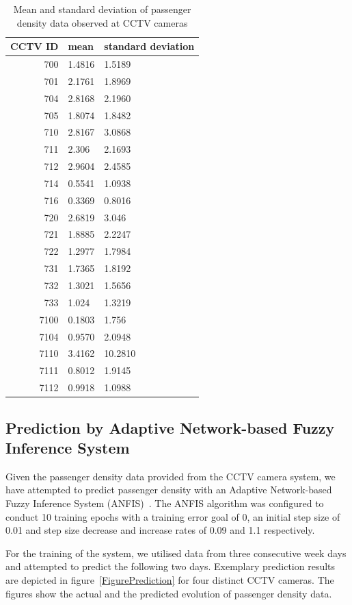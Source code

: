 \begin{table}
\begin{center}
\caption{Mean and standard deviation of passenger density data observed at CCTV cameras}
\label{tablePassengerDensity}
\begin{tabular}{r|ll}
CCTV ID & mean & standard deviation\\\hline
 700 & 1.4816 & 1.5189\\
 701 & 2.1761& 1.8969 \\
704 & 2.8168 & 2.1960\\
705 & 1.8074& 1.8482\\
710 & 2.8167& 3.0868\\
711 & 2.306& 2.1693\\
712 & 2.9604& 2.4585\\
714 & 0.5541& 1.0938 \\
716 & 0.3369& 0.8016\\
720 & 2.6819& 3.046 \\
721 & 1.8885& 2.2247\\
722 & 1.2977& 1.7984\\
731 & 1.7365& 1.8192 \\
732 & 1.3021& 1.5656\\
733 & 1.024& 1.3219\\
7100 & 0.1803& 1.756 \\
7104 & 0.9570& 2.0948\\
7110 & 3.4162& 10.2810\\
7111 & 0.8012& 1.9145\\
7112 & 0.9918& 1.0988\\\hline
\end{tabular}
\end{center}
\end{table}
\pagebreak

\subsection{Prediction by Adaptive Network-based Fuzzy Inference System}
Given the passenger density data provided from the CCTV camera system, we have attempted to predict passenger density with an Adaptive Network-based Fuzzy Inference System (ANFIS)~\cite{Prediction_Jang_1993}.
The ANFIS algorithm was configured to conduct 10 training epochs with a training error goal of 0, an initial step size of 0.01 and step size decrease and increase rates of 0.09 and 1.1 respectively. 

For the training of the system, we utilised data from three consecutive week days and attempted to predict the following two days. 
Exemplary prediction results are depicted in figure~\ref{FigurePrediction} for four distinct CCTV cameras.
The figures show the actual and the predicted evolution of passenger density data.


